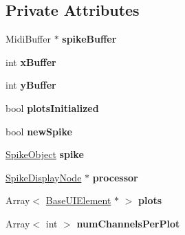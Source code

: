 \subsection*{Private Attributes}
\begin{DoxyCompactItemize}
\item 
\hypertarget{classSpikeDisplayCanvas_a465200c52a811ab4a539ad9eea3e8888}{Midi\-Buffer $\ast$ {\bfseries spike\-Buffer}}\label{classSpikeDisplayCanvas_a465200c52a811ab4a539ad9eea3e8888}

\item 
\hypertarget{classSpikeDisplayCanvas_a701e15bea21f2d8af9b8caa9183fc657}{int {\bfseries x\-Buffer}}\label{classSpikeDisplayCanvas_a701e15bea21f2d8af9b8caa9183fc657}

\item 
\hypertarget{classSpikeDisplayCanvas_a1b5deaee5b86c8641afefb3d2ce1dea2}{int {\bfseries y\-Buffer}}\label{classSpikeDisplayCanvas_a1b5deaee5b86c8641afefb3d2ce1dea2}

\item 
\hypertarget{classSpikeDisplayCanvas_a76ad239e72e4637333e4400b524cd91d}{bool {\bfseries plots\-Initialized}}\label{classSpikeDisplayCanvas_a76ad239e72e4637333e4400b524cd91d}

\item 
\hypertarget{classSpikeDisplayCanvas_a468455eab6953928c64fce9acc9e07d2}{bool {\bfseries new\-Spike}}\label{classSpikeDisplayCanvas_a468455eab6953928c64fce9acc9e07d2}

\item 
\hypertarget{classSpikeDisplayCanvas_afa42d1f2d2642aa47caebb0e27349d7a}{\hyperlink{structSpikeObject}{Spike\-Object} {\bfseries spike}}\label{classSpikeDisplayCanvas_afa42d1f2d2642aa47caebb0e27349d7a}

\item 
\hypertarget{classSpikeDisplayCanvas_ab5a1f299825af666299ab36b992fad20}{\hyperlink{classSpikeDisplayNode}{Spike\-Display\-Node} $\ast$ {\bfseries processor}}\label{classSpikeDisplayCanvas_ab5a1f299825af666299ab36b992fad20}

\item 
\hypertarget{classSpikeDisplayCanvas_a2639e611dc324c00b88031bd69d982e6}{Array$<$ \hyperlink{classBaseUIElement}{Base\-U\-I\-Element} $\ast$ $>$ {\bfseries plots}}\label{classSpikeDisplayCanvas_a2639e611dc324c00b88031bd69d982e6}

\item 
\hypertarget{classSpikeDisplayCanvas_add81dd581309781a98a43bd25577eb94}{Array$<$ int $>$ {\bfseries num\-Channels\-Per\-Plot}}\label{classSpikeDisplayCanvas_add81dd581309781a98a43bd25577eb94}


\end{DoxyCompactItemize}
